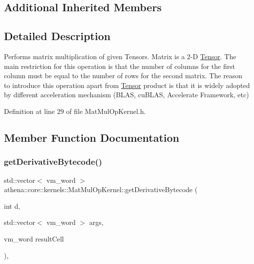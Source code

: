 \subsection*{Additional Inherited Members}


\subsection{Detailed Description}
Performs matrix multiplication of given Tensors. Matrix is a 2-\/D \mbox{\hyperlink{classathena_1_1core_1_1_tensor}{Tensor}}. The main restriction for this operation is that the number of columns for the first column must be equal to the number of rows for the second matrix. The reason to introduce this operation apart from \mbox{\hyperlink{classathena_1_1core_1_1_tensor}{Tensor}} product is that it is widely adopted by different acceleration mechanism (B\+L\+AS, cu\+B\+L\+AS, Accelerate Framework, etc) 

Definition at line 29 of file Mat\+Mul\+Op\+Kernel.\+h.



\subsection{Member Function Documentation}
\mbox{\label{classathena_1_1core_1_1kernels_1_1_mat_mul_op_kernel_a42d08b8004e8033e01988eb2392215c8}} 
\subsubsection{\texorpdfstring{get\+Derivative\+Bytecode()}{getDerivativeBytecode()}}
{\footnotesize\ttfamily std\+::vector$<$ vm\+\_\+word $>$ athena\+::core\+::kernels\+::\+Mat\+Mul\+Op\+Kernel\+::get\+Derivative\+Bytecode (\begin{DoxyParamCaption}\item[{int}]{d,  }\item[{std\+::vector$<$ vm\+\_\+word $>$}]{args,  }\item[{vm\+\_\+word}]{result\+Cell }\end{DoxyParamCaption})\hspace{0.3cm}{\ttfamily [override]}, {\ttfamily [virtual]}}

